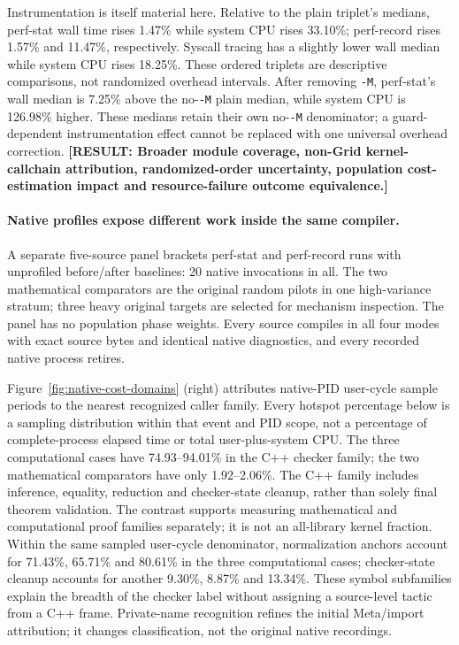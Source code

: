\documentclass[10pt,twocolumn]{article}
\newcommand{\missing}[1]{\textbf{[RESULT: #1]}}
\begin{document}
Instrumentation is itself material here. Relative to the plain triplet's
medians, perf-stat wall time rises 1.47\% while system CPU rises 33.10\%;
perf-record rises 1.57\% and 11.47\%, respectively.
Syscall tracing has a slightly lower wall median while system CPU rises
18.25\%. These ordered triplets are descriptive comparisons, not randomized
overhead intervals. After removing \texttt{-M}, perf-stat's wall median
is 7.25\% above the no-\texttt{-M} plain median, while system CPU is
126.98\% higher. These medians retain their own no-\texttt{-M} denominator;
a guard-dependent instrumentation effect cannot be replaced with one
universal overhead correction.
\missing{Broader module coverage, non-Grid kernel-callchain attribution,
randomized-order uncertainty, population cost-estimation impact and
resource-failure outcome equivalence.}


\paragraph{Native profiles expose different work inside the same compiler.}
A separate five-source panel brackets perf-stat and perf-record runs with
unprofiled before/after baselines: 20 native invocations in all.
The two mathematical comparators are the original random pilots in one
high-variance stratum; three heavy original targets are selected for
mechanism inspection. The panel has no population phase weights.
Every source compiles in all four modes with exact source bytes and
identical native diagnostics, and every recorded native process retires.

Figure~\ref{fig:native-cost-domains} (right) attributes native-PID user-cycle sample
periods to the nearest recognized caller family.
Every hotspot percentage below is a sampling distribution within that
event and PID scope, not a percentage of complete-process elapsed time
or total user-plus-system CPU.
The three computational cases have 74.93--94.01\% in the C++ checker family;
the two mathematical comparators have only 1.92--2.06\%.
The C++ family includes inference, equality, reduction and checker-state
cleanup, rather than solely final theorem validation.
The contrast supports measuring mathematical and computational proof
families separately; it is not an all-library kernel fraction.
Within the same sampled user-cycle denominator, normalization anchors
account for 71.43\%, 65.71\% and 80.61\% in the three computational
cases; checker-state cleanup accounts for another 9.30\%, 8.87\% and
13.34\%. These symbol subfamilies explain the breadth of the checker
label without assigning a source-level tactic from a C++ frame.
Private-name recognition refines the initial Meta/import attribution;
it changes classification, not the original native recordings.
\end{document}
